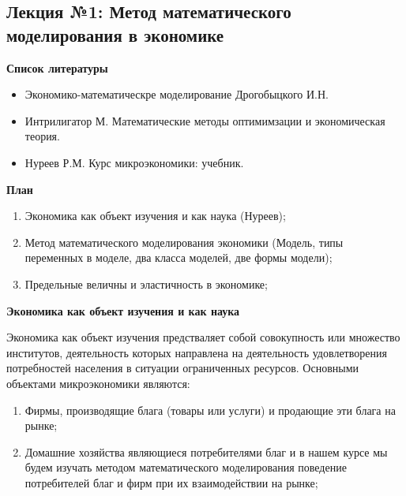 \documentclass[12pt,a4paper]{article}
\author{GH-TIMe}
\begin{document}
\begin{center}
\section*{Лекция №1: Метод математического моделирования в экономике}
\end{center}

\begin{center}
\textbf{Список литературы}
\end{center}
\begin{itemize}
\item Экономико-математическре моделирование Дрогобыцкого И.Н.
\item Интрилигатор М. Математические методы оптимимзации и экономическая теория.
\item Нуреев Р.М. Курс микроэкономики: учебник.
\end{itemize}

\begin{center}
\textbf{План}
\end{center}

\begin{enumerate}
\item Экономика как объект изучения и как наука (Нуреев);
\item Метод математического моделирования экономики (Модель, типы переменных в моделе, два класса моделей, две формы модели);
\item Предельные величны и эластичность в экономике;
\end{enumerate}

\begin{center}
\textbf{Экономика как объект изучения и как наука}
\end{center}

Экономика как объект изучения предстваляет собой совокупность или множество институтов, деятельность которых направлена на деятельность удовлетворения потребностей населения в ситуации ограниченных ресурсов. Основными объектами микроэкономики являются:
\begin{enumerate}
\item Фирмы, производящие блага (товары или услуги) и продающие эти блага на рынке;
\item Домашние хозяйства являющиеся потребителями благ и в нашем курсе мы будем изучать методом математического моделирования поведение потребителей благ и фирм при их взаимодействии на рынке;
\end{enumerate}
\end{document}
